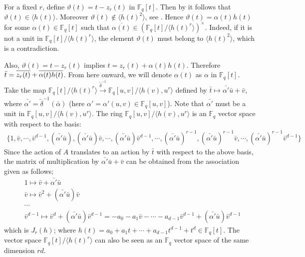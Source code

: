 \documentclass[11pt,twoside]{amsart}
\theoremstyle{definition} %
\begin{document}
For a fixed $r$, define $\vartheta(t)=t-z_r(t)$ in $\mathbb{F}_q[t]$. 
Then by  it follows that $\vartheta(t)\in \langle h(t)\rangle$. 
Moreover $\vartheta(t)\notin \langle h(t)^2\rangle$, see \cite[p. 17]{Singla2010}.
Hence $\vartheta(t)=\alpha(t)h(t)$ for some $\alpha(t)\in \mathbb{F}_q[t]$ such that $\overline{\alpha(t)}\in (\mathbb{F}_q[t]/\langle h(t)^r\rangle)^{\times} $.
Indeed, if it is not a unit in $\mathbb{F}_q[t]/\langle h(t)^r\rangle$, the element $\vartheta(t)$ must belong to $\langle h(t)^2\rangle$, which is a contradiction.

Also, $\vartheta(t)=t-z_r(t)$ implies $t=z_r(t)+\alpha(t)h(t)$. 
Therefore $\Bar{t}= \overline{z_r(t)}+\overline{\alpha(t)h(t)}$.
From here onward, we will denote $\alpha(t)$ as $\alpha$ in $\mathbb{F}_q[t]$.
Take the map $\mathbb{F}_q[t]/\langle h(t)^r\rangle\xrightarrow[]{\tilde{\delta}^{-1}} {\mathbb{F}_q[u,v]/\langle h(v),u^r\rangle}$
defined by $\bar{t}\mapsto \bar{\alpha'}\bar{u}+\bar{v}$, where $\bar{\alpha'}={\tilde{\delta}}^{-1}(\bar{\alpha})$ (here $\alpha'=\alpha'(u,v) \in \mathbb{F}_q[u,v]$).
Note that $\bar{\alpha'}$ must be a unit in $\mathbb{F}_q[u,v]/\langle h(v),u^r\rangle$.
The ring $\mathbb{F}_q[u,v]/\langle h(v),u^r\rangle$ is an $\mathbb{F}_q$ vector space with respect to the basis:
\begin{align*}
   \{1, \bar{v},\cdots,\bar{v}^{d-1},
  (\bar{\alpha'}\bar{u}),(\bar{\alpha'}\bar{u})\bar{v},\cdots,(\bar{\alpha'}\bar{u})\bar{v}^{d-1}, 
  \cdots,
  (\bar{\alpha'}\bar{u})^{r-1}, (\bar{\alpha'}\bar{u})^{r-1}\bar{v},\cdots,(\bar{\alpha'}\bar{u})^{r-1}\bar{v}^{d-1}\}
\end{align*}
Since the action of $A$ translates to an action by $\bar{t}$ with respect to the above basis, the matrix of multiplication by $\bar{\alpha'}\bar{u}+\bar{v}$ can be obtained from the association given as follows;
\begin{align*}
  &1\mapsto \bar{v} + \bar{\alpha'}\bar{u}\\
  &\bar{v}\mapsto \bar{v}^2 + (\bar{\alpha'}\bar{u})\bar{v}\\
  &\cdots\\
  &\bar{v}^{d-1}\mapsto \bar{v}^d+ (\bar{\alpha'}\bar{u})\bar{v}^{d-1}=-a_0-a_1\bar{v}-\cdots-a_{d-1}\bar{v}^{d-1}+ (\bar{\alpha'}\bar{u})\bar{v}^{d-1}
\end{align*}
which is $J_r(h)$; where $h(t)=a_0+a_1t+\cdots+a_{d-1}t^{d-1}+t^d \in \mathbb{F}_q[t]$.
The vector space $\mathbb{F}_q[t]/\langle h(t)^r\rangle$ can also be seen as an $\mathbb{F}_q$ vector space of the same dimension $rd$.
\end{document}

